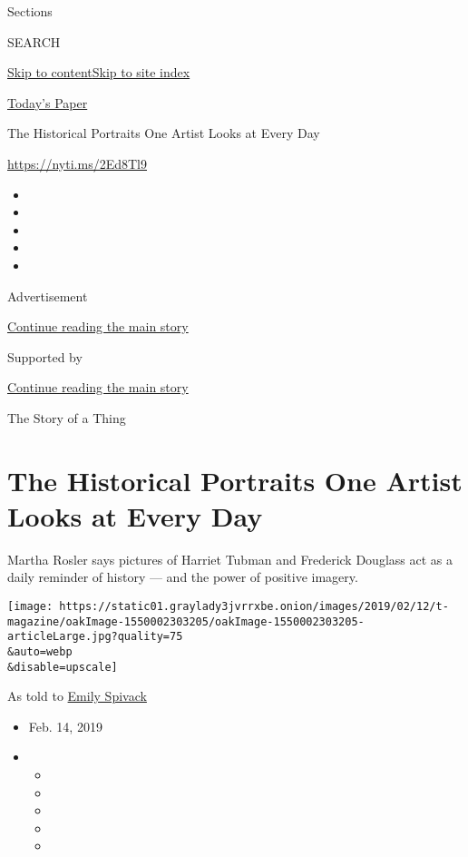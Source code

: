 Sections

SEARCH

\protect\hyperlink{site-content}{Skip to
content}\protect\hyperlink{site-index}{Skip to site index}

\href{https://myaccount.nytimes3xbfgragh.onion/auth/login?response_type=cookie\&client_id=vi}{}

\href{https://www.nytimes3xbfgragh.onion/section/todayspaper}{Today's
Paper}

The Historical Portraits One Artist Looks at Every Day

\url{https://nyti.ms/2Ed8Tl9}

\begin{itemize}
\item
\item
\item
\item
\item
\end{itemize}

Advertisement

\protect\hyperlink{after-top}{Continue reading the main story}

Supported by

\protect\hyperlink{after-sponsor}{Continue reading the main story}

The Story of a Thing

\hypertarget{the-historical-portraits-one-artist-looks-at-every-day}{%
\section{The Historical Portraits One Artist Looks at Every
Day}\label{the-historical-portraits-one-artist-looks-at-every-day}}

Martha Rosler says pictures of Harriet Tubman and Frederick Douglass act
as a daily reminder of history --- and the power of positive imagery.

\texttt{[image: https://static01.graylady3jvrrxbe.onion/images/2019/02/12/t-magazine/oakImage-1550002303205/oakImage-1550002303205-articleLarge.jpg?quality=75\\\&auto=webp\\\&disable=upscale]}

As told to
\href{https://www.nytimes3xbfgragh.onion/by/emily-spivack}{Emily
Spivack}

\begin{itemize}
\item
  Feb. 14, 2019
\item
  \begin{itemize}
  \item
  \item
  \item
  \item
  \item
  \end{itemize}
\end{itemize}

